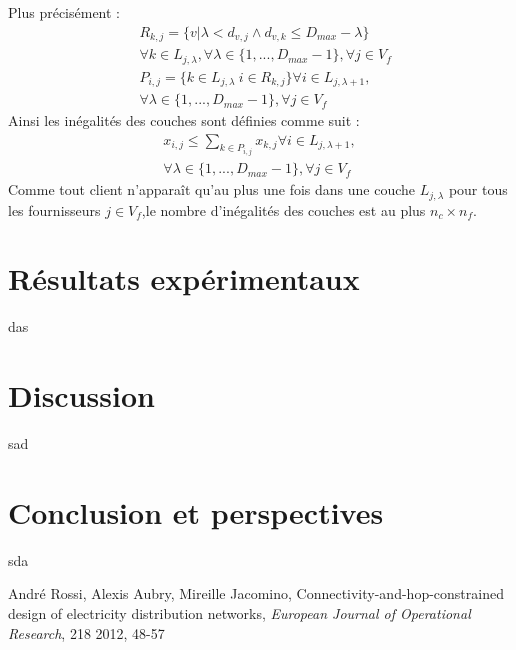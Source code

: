 \documentclass[12pt,a4paper]{article}
\begin{document}
\begin{multicols}{2}
Plus précisément :
\begin{align*}
&R_{k,j} = \{ v | \lambda < d_{v,j} \wedge d_{v,k}\leq D_{max}-\lambda \} \\ 
&\forall k \in L_{j,\lambda}, \forall \lambda \in \{ 1,...,D_{max}-1 \}, \forall j \in V_{f}\\
&P_{i,j} = \{ k \in L_{j,\lambda} \ i \in R_{k,j} \} \forall i \in L_{j,\lambda +1}, \\ 
&  \forall \lambda \in \{ 1,...,D_{max}-1 \}, \forall j \in V_{f}
\end{align*}
Ainsi les inégalités des couches sont définies comme suit : 
\begin{equation}\label{eq:layers}
\begin{aligned}
x_{i,j} \leq \sum_{k\in P_{i,j}}{x_{k,j}} \forall i \in L_{j,\lambda +1}, \\ \forall \lambda \in \{ 1,...,D_{max}-1 \}, \forall j \in V_{f}
\end{aligned}
\end{equation}
Comme tout client n'apparaît qu'au plus une fois dans une couche $L_{j,\lambda}$ pour tous les fournisseurs $j \in V_{f}$,le nombre d'inégalités des couches est au plus $n_{c}\times n_{f}$.
\section{Résultats expérimentaux}
das
\section{Discussion}
sad
\section{Conclusion et perspectives}
sda


\begin{thebibliography}{20}
André Rossi, Alexis Aubry, Mireille Jacomino, Connectivity-and-hop-constrained design of electricity distribution networks,  \textit{European Journal of Operational Research}, 218 2012, 48-57
\end{thebibliography}
\end{multicols}
\end{document}
